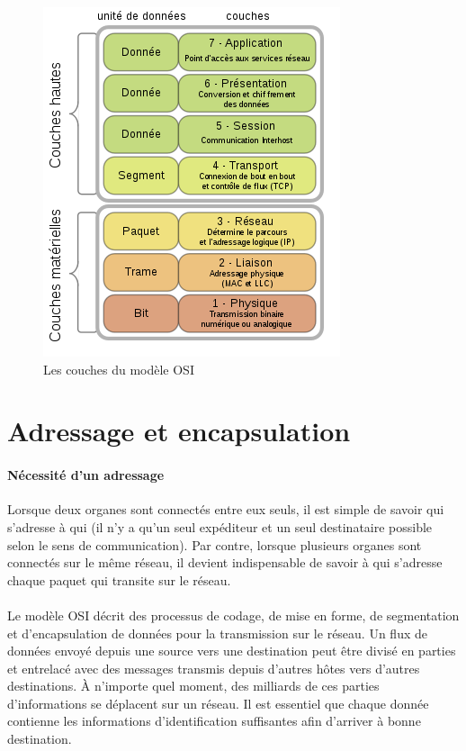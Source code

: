 \documentclass[11pt]{article}
\begin{document}
\begin{figure}[h!t]
  \centering
  \includegraphics[height=.3\textheight]{Src/Images/reseau_OSI}
  \caption{Les couches du modèle OSI}
  \label{fig:res_osi}
\end{figure}

\section{Adressage et encapsulation}
\paragraph{Nécessité d'un adressage}
Lorsque deux organes sont connectés entre eux seuls, il est simple de savoir qui s'adresse à qui (il n'y a qu'un seul expéditeur et un seul destinataire possible selon le sens de communication).
Par contre, lorsque plusieurs organes sont connectés sur le même réseau, il devient indispensable de savoir à qui s'adresse chaque paquet qui transite sur le réseau.
\paragraph{}
Le modèle OSI décrit des processus de codage, de mise en forme, de segmentation et d'encapsulation de données pour la transmission sur le réseau. Un flux de données envoyé depuis une source vers une destination peut être divisé en parties et entrelacé avec des messages transmis depuis d'autres hôtes vers d'autres destinations. À n'importe quel moment, des milliards de ces parties d'informations se déplacent sur un réseau. Il est essentiel que chaque donnée contienne les informations d'identification suffisantes afin d'arriver à bonne destination.
\end{document}
